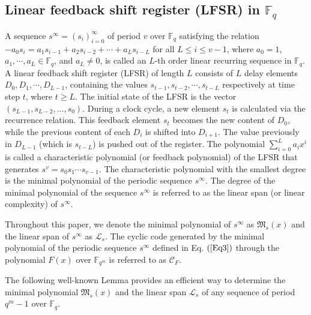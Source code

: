 \documentclass[pdflatex,sn-mathphys-num]{sn-jnl}%
\theoremstyle{thmstyleone}%
\theoremstyle{thmstyletwo}%
\theoremstyle{thmstylethree}%
\begin{document}
\subsection{Linear feedback shift register (LFSR) in $\mathbb{F}_{q}$}
A sequence $s^{\infty}=(s_{i})_{i=0}^{\infty}$ of period $v$ over $\mathbb{F}_{q}$ satisfying the relation $-a_{0}s_{i}=a_{1}s_{i-1}+a_{2}s_{i-2}+\cdots+a_{L}s_{i-L}$ for all $L\leq i\leq v-1$, where $a_{0}=1$, $a_{1},\cdots,a_{L}\in\mathbb{F}_{q}$, and $a_{L}\neq 0$, is called an $L$-th order linear recurring sequence in $\mathbb{F}_{q}$. A linear feedback shift register (LFSR) of length $L$ consists of $L$ delay elements $D_{0},D_{1},\cdots,D_{L-1}$, containing the values $s_{t-1},s_{t-2},\cdots,s_{t-L}$ respectively at time step $t$, where $t\geq L$. The initial state of the LFSR is the vector $(s_{L-1}, s_{L-2}, \dots, s_{0})$. During a clock cycle, a new element $s_t$ is calculated via the recurrence relation. This feedback element $s_t$ becomes the new content of $D_0$, while the previous content of each $D_i$ is shifted into $D_{i+1}$. The value previously in $D_{L-1}$ (which is $s_{t-L}$) is pushed out of the register. The polynomial $\sum_{i=0}^{L}a_{i}x^{i}$ is called a characteristic polynomial (or feedback polynomial) of the LFSR that generates $s^{v}=s_{0}s_{1}\cdots s_{v-1}$. The characteristic polynomial with the smallest degree is the minimal polynomial of the periodic sequence $s^{\infty}$. The degree of the minimal polynomial of the sequence $s^{\infty}$ is referred to as the linear span (or linear complexity) of $s^{\infty}$.
  \par Throughout this paper, we denote the minimal polynomial of $s^{\infty}$ as $\mathfrak{M}_{s}(x)$ and the linear span of $s^{\infty}$ as $\mathcal{L}_{s}$. The cyclic code generated by the minimal polynomial of the periodic sequence $s^{\infty}$ defined in Eq. $(\ref{Eq3})$ through the polynomial $F(x)$ over $\mathbb{F}_{q^m}$ is referred to as $\mathcal{C}_{F}$.
  \par The following well-known Lemma \cite{P-2} provides an efficient way to determine the minimal polynomial $\mathfrak{M}_{s}(x)$ and the linear span $\mathcal{L}_{s}$ of any sequence of period $q^m-1$ over $\mathbb{F}_{q}$.
\end{document}

